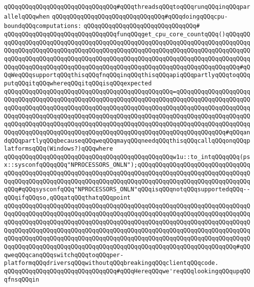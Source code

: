 \verb|qQQqqQQqqQQqqQQqqQQqqQQqqQQqqQQq#qQQqthreadsqQQqtoqQQqrunqQQqinqQQqparallelqQQqwhen|\newline
\verb|qQQqqQQqqQQqqQQqqQQqqQQqqQQqqQQq#qQQqdoingqQQqcpu-boundqQQqcomputations:|\newline
\verb|qQQqqQQqqQQqqQQqqQQqqQQqqQQqqQQq#|\newline
\verb|qQQqqQQqqQQqqQQqqQQqqQQqqQQqqQQqfunqQQqget_cpu_core_countqQQq()qQQqqQQqqQQqqQQqqQQqqQQqqQQqqQQqqQQqqQQqqQQqqQQqqQQqqQQqqQQqqQQqqQQqqQQqqQQqqQQqqQQqqQQqqQQqqQQqqQQqqQQqqQQqqQQqqQQqqQQqqQQqqQQqqQQqqQQqqQQqqQQqqQQqqQQqqQQqqQQqqQQqqQQqqQQqqQQqqQQqqQQqqQQqqQQqqQQqqQQqqQQqqQQqqQQqqQQqqQQqqQQqqQQqqQQqqQQqqQQqqQQqqQQqqQQqqQQqqQQqqQQqqQQqqQQqqQQqqQQqqQQq#qQQqWeqQQqsupportqQQqthisqQQqfnqQQqinqQQqthisqQQqapiqQQqpartlyqQQqtoqQQqputqQQqitqQQqwhereqQQqitqQQqisqQQqexpected|\newline
\verb|qQQqqQQqqQQqqQQqqQQqqQQqqQQqqQQqqQQqqQQqqQQqqQQq=qQQqqQQqqQQqqQQqqQQqqQQqqQQqqQQqqQQqqQQqqQQqqQQqqQQqqQQqqQQqqQQqqQQqqQQqqQQqqQQqqQQqqQQqqQQqqQQqqQQqqQQqqQQqqQQqqQQqqQQqqQQqqQQqqQQqqQQqqQQqqQQqqQQqqQQqqQQqqQQqqQQqqQQqqQQqqQQqqQQqqQQqqQQqqQQqqQQqqQQqqQQqqQQqqQQqqQQqqQQqqQQqqQQqqQQqqQQqqQQqqQQqqQQqqQQqqQQqqQQqqQQqqQQqqQQqqQQqqQQqqQQqqQQqqQQqqQQqqQQqqQQqqQQqqQQqqQQqqQQqqQQqqQQqqQQqqQQqqQQqqQQqqQQqqQQqqQQqqQQqqQQq#qQQqandqQQqpartlyqQQqbecauseqQQqweqQQqmayqQQqneedqQQqthisqQQqcallqQQqonqQQqplatformsqQQq(Windows?)qQQqwhere|\newline
\verb|qQQqqQQqqQQqqQQqqQQqqQQqqQQqqQQqqQQqqQQqqQQqqQQqw1u::to_intqQQqqQQq(psx::sysconfqQQqqQQq"NPROCESSORS_ONLN");qQQqqQQqqQQqqQQqqQQqqQQqqQQqqQQqqQQqqQQqqQQqqQQqqQQqqQQqqQQqqQQqqQQqqQQqqQQqqQQqqQQqqQQqqQQqqQQqqQQqqQQqqQQqqQQqqQQqqQQqqQQqqQQqqQQqqQQqqQQqqQQqqQQqqQQqqQQqqQQqqQQqqQQqqQQqqQQq#qQQqsysconfqQQq"NPROCESSORS_ONLN"qQQqisqQQqnotqQQqsupportedqQQq--qQQqifqQQqso,qQQqatqQQqthatqQQqpoint|\newline
\verb|qQQqqQQqqQQqqQQqqQQqqQQqqQQqqQQqqQQqqQQqqQQqqQQqqQQqqQQqqQQqqQQqqQQqqQQqqQQqqQQqqQQqqQQqqQQqqQQqqQQqqQQqqQQqqQQqqQQqqQQqqQQqqQQqqQQqqQQqqQQqqQQqqQQqqQQqqQQqqQQqqQQqqQQqqQQqqQQqqQQqqQQqqQQqqQQqqQQqqQQqqQQqqQQqqQQqqQQqqQQqqQQqqQQqqQQqqQQqqQQqqQQqqQQqqQQqqQQqqQQqqQQqqQQqqQQqqQQqqQQqqQQqqQQqqQQqqQQqqQQqqQQqqQQqqQQqqQQqqQQqqQQqqQQqqQQqqQQqqQQqqQQqqQQqqQQqqQQqqQQqqQQqqQQqqQQqqQQqqQQqqQQqqQQqqQQqqQQqqQQqqQQqqQQqqQQqqQQq#qQQqweqQQqcanqQQqswitchqQQqtoqQQqper-platformqQQqdriversqQQqwithoutqQQqbreakingqQQqclientqQQqcode.|\newline
\verb|qQQqqQQqqQQqqQQqqQQqqQQqqQQqqQQq#qQQqHereqQQqwe'reqQQqlookingqQQqupqQQqfnsqQQqin|\newline
